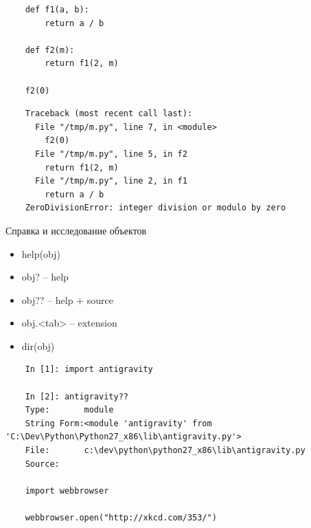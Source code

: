 \documentclass{article}
\begin{document}
{
\Large
\begin{lstlisting}
    def f1(a, b):
        return a / b

    def f2(m):
        return f1(2, m)

    f2(0)
\end{lstlisting}

\begin{lstlisting}
    Traceback (most recent call last):
      File "/tmp/m.py", line 7, in <module>
        f2(0)
      File "/tmp/m.py", line 5, in f2
        return f1(2, m)
      File "/tmp/m.py", line 2, in f1
        return a / b
    ZeroDivisionError: integer division or modulo by zero
\end{lstlisting}
}

\newpage

\begin{center} Справка и исследование объектов \end{center}
\begin{itemize}
    \item help(obj)
    \item obj?    -- help
    \item obj??   -- help + source
    \item obj.<tab>  -- extension
    \item dir(obj)
\end{itemize}

\begin{lstlisting}
    In [1]: import antigravity

    In [2]: antigravity??
    Type:       module
    String Form:<module 'antigravity' from 'C:\Dev\Python\Python27_x86\lib\antigravity.py'>
    File:       c:\dev\python\python27_x86\lib\antigravity.py
    Source:

    import webbrowser

    webbrowser.open("http://xkcd.com/353/")
\end{lstlisting}
\newpage

\end{document}
